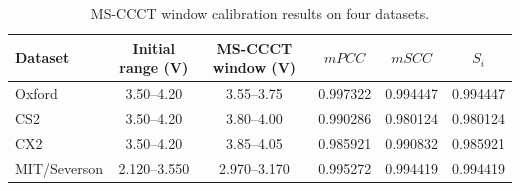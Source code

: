 \begin{table}
\TableStyle
\caption{MS-CCCT window calibration results on four datasets.}
\label{tab:4-hi-window-calibration}
\begin{tabularx}{\linewidth}{@{\extracolsep{\fill}}L{1.05}C{1.35}C{1.35}C{0.70}C{0.70}C{0.70}@{}}
\toprule
Dataset & Initial range (V) & MS-CCCT window (V) & $mPCC$ & $mSCC$ & $S_i$ \\
\midrule
Oxford & 3.50--4.20 & 3.55--3.75 & 0.997322 & 0.994447 & 0.994447 \\
CS2 & 3.50--4.20 & 3.80--4.00 & 0.990286 & 0.980124 & 0.980124 \\
CX2 & 3.50--4.20 & 3.85--4.05 & 0.985921 & 0.990832 & 0.985921 \\
MIT/Severson & 2.120--3.550 & 2.970--3.170 & 0.995272 & 0.994419 & 0.994419 \\
\bottomrule
\end{tabularx}
\end{table}
